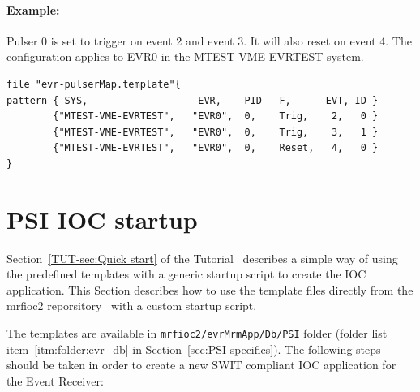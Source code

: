 \documentclass[12pt,a4paper]{article}
\let\stdsection\section
\renewcommand\section{\newpage\stdsection}
\begin{document}
\paragraph{Example:} Pulser 0 is set to trigger on event 2 and event 3. It will also
reset on event 4. The configuration applies to EVR0 in the MTEST-VME-EVRTEST system.

\begin{verbatim}
file "evr-pulserMap.template"{
pattern { SYS,                   EVR,    PID   F,      EVT, ID }
        {"MTEST-VME-EVRTEST",   "EVR0",  0,    Trig,    2,   0 }
        {"MTEST-VME-EVRTEST",   "EVR0",  0,    Trig,    3,   1 }
        {"MTEST-VME-EVRTEST",   "EVR0",  0,    Reset,   4,   0 }
}
\end{verbatim}


\section{PSI IOC startup}\label{sec:PSI IOC startup}
Section~\ref{TUT-sec:Quick start} of the Tutorial~\cite{tutorial} describes a simple way of using the predefined templates with a generic startup script to create the IOC application. This Section describes how to use the template files directly from the mrfioc2 reporsitory~\cite{git_mrfioc2} with a custom startup script.

The templates are available in \texttt{mrfioc2/evrMrmApp/Db/PSI} folder (folder list item~\ref{itm:folder:evr_db} in Section~\ref{sec:PSI specifics}). The following steps should be taken in order to create a new SWIT compliant IOC application for the Event Receiver:
\end{document}
